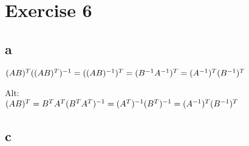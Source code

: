 \documentclass{article}
\begin{document}
\newpage
\section*{Exercise 6}

\subsection*{a}
$
(AB)^{T}\\
((AB)^{T})^{-1} = \\
((AB)^{-1})^{T} = \\
(B^{-1}A^{-1})^{T} = \\
(A^{-1})^{T}(B^{-1})^{T}
$

Alt:\\
$
(AB)^{T} = B^{T}A^{T}\\
(B^{T}A^{T})^{-1} = \\
(A^{T})^{-1}(B^{T})^{-1} = \\
(A^{-1})^{T}(B^{-1})^{T}
$

\subsection*{c}
\end{document}
